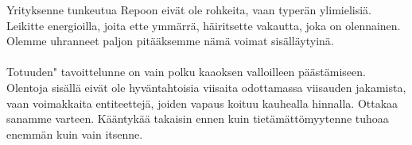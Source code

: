 \documentclass{article}
\begin{document}
\begin{infobox}
Yrityksenne tunkeutua Repoon eivät ole rohkeita, vaan typerän ylimielisiä. Leikitte energioilla, joita ette ymmärrä, häiritsette vakautta, joka on olennainen. Olemme uhranneet paljon pitääksemme nämä voimat sisälläytyinä.\\
\\
Totuuden" tavoittelunne on vain polku kaaoksen valloilleen päästämiseen. Olentoja sisällä eivät ole hyväntahtoisia viisaita odottamassa viisauden jakamista, vaan voimakkaita entiteettejä, joiden vapaus koituu kauhealla hinnalla. Ottakaa sanamme varteen. Kääntykää takaisin ennen kuin tietämättömyytenne tuhoaa enemmän kuin vain itsenne.
\end{infobox}
\end{document}
